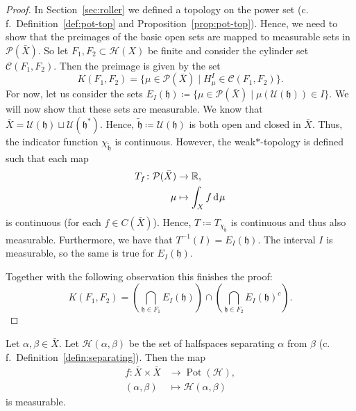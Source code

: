\begin{proof}
  In Section~\ref{sec:roller} we defined a topology on the power set (c.\,f.\ Definition~\ref{def:pot-top} and Proposition~\ref{prop:pot-top}). Hence, we need to show that the preimages of the basic open sets are mapped to measurable sets in \(\mathcal{P}(\bar X)\). So let \(F_1, F_2 \subset \mathcal{H}(X)\) be finite and consider the cylinder set \(\mathcal{C}(F_1, F_2)\). Then the preimage is given by the set
  \[
    K(F_1, F_2) = \{\mu \in \mathcal{P}(\bar X) \mid H^I_\mu \in \mathcal{C}(F_1, F_2)\}.
  \]
  For now, let us consider the sets \(E_I(\mathfrak{h}) \coloneqq \{\mu \in \mathcal{P}(\bar X) \mid \mu(\mathcal{U}(\mathfrak{h})) \in I\}\). We will now show that these sets are measurable. We know that \(\bar X = \mathcal{U}(\mathfrak{h}) \sqcup \mathcal{U}(\mathfrak{h}^\ast)\). Hence, \(\mathfrak{\tilde h} \coloneqq \mathcal{U}(\mathfrak{h})\) is both open and closed in \(\bar X\). Thus, the indicator function \(\chi_{\mathfrak{\tilde h}}\) is continuous. However, the weak\(\ast\)-topology is defined such that each map
  \begin{align*}
    T_f\colon \mathcal{P}(\bar X) &\to \R,\\
    \mu &\mapsto \int_X f \d\mu
  \end{align*}
  is continuous (for each \(f \in C(\bar X)\)). Hence, \(T \coloneqq T_{\chi_{\mathfrak{\tilde h}}}\) is continuous and thus also measurable. Furthermore, we have that \(T^{-1}(I) = E_I(\mathfrak{h})\). The interval \(I\) is measurable, so the same is true for \(E_I(\mathfrak{h})\).

  Together with the following observation this finishes the proof:
  \[
    K(F_1, F_2) = \left (\bigcap_{\mathfrak{h} \in F_1} E_I(\mathfrak{h}) \right ) \cap \left ( \bigcap_{\mathfrak{h} \in F_2} E_I(\mathfrak{h})^{c}\right).
  \]
\end{proof}


\begin{lemma}
  \label{lem:measurable-interval}
  Let \(\alpha, \beta \in \bar X\). Let \(\mathcal{H}(\alpha, \beta)\) be the set of halfspaces separating \(\alpha\) from \(\beta\) (c.\,f.\ Definition~\ref{defin:separating}). Then the map
  \begin{align*}
    f\colon \bar X \times \bar X &\to \operatorname{Pot}(\mathcal{H}),\\
    (\alpha, \beta) &\mapsto \mathcal{H}(\alpha, \beta)
  \end{align*}
  is measurable.
\end{lemma}

